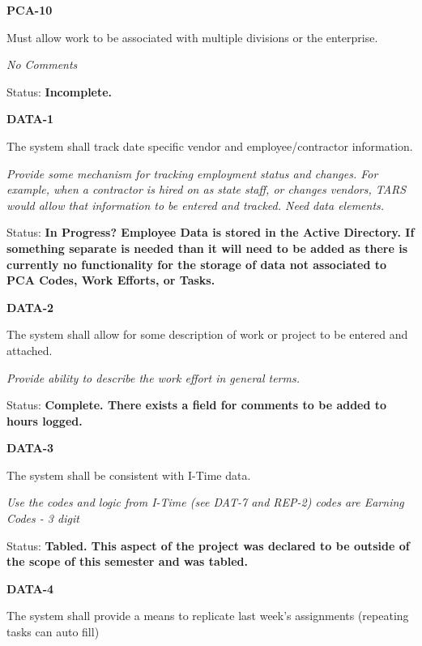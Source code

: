 \documentclass{article}
\begin{document}
\noindent \textit{}


\noindent \textbf{PCA-10}

\noindent Must allow work to be associated with multiple divisions or the enterprise.

\textit{No Comments}

 Status: \textbf{Incomplete.}

\noindent \textit{}


\noindent \textbf{DATA-1}

\noindent The system shall track date specific vendor and employee/contractor information.

\noindent \textit{Provide some mechanism for tracking employment status and changes. For example, when a contractor is hired on as state staff, or changes vendors, TARS would allow that information to be entered and tracked. Need data elements.}

\noindent Status: \textbf{In Progress?  Employee Data is stored in the Active Directory.  If something separate is needed than it will need to be added as there is currently no functionality for the storage of data not associated to PCA Codes, Work Efforts, or Tasks.}

\noindent \textit{}


\noindent \textbf{DATA-2}

\noindent The system shall allow for some description of work or project to be entered and attached.

\textit{Provide ability to describe the work effort in general terms.}

Status: \textbf{Complete.  There exists a field for comments to be added to hours logged.}\textit{}

\noindent \textit{}


\noindent \textbf{DATA-3}

\noindent The system shall be consistent with I-Time data.

\textit{Use the codes and logic from I-Time (see DAT-7 and REP-2) codes are Earning Codes - 3 digit}

\noindent Status: \textbf{Tabled.  This aspect of the project was declared to be outside of the scope of this semester and was tabled.}\textit{}

\noindent \textit{}


\noindent \textbf{DATA-4}

\noindent The system shall provide a means to replicate last week's assignments (repeating tasks can auto fill)
\end{document}

